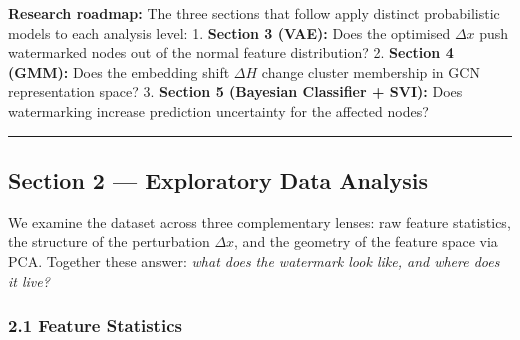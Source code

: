 \documentclass[11pt]{article}
\begin{document}
\textbf{Research roadmap:} The three sections that follow apply distinct
probabilistic models to each analysis level: 1. \textbf{Section 3
(VAE):} Does the optimised \(\Delta x\) push watermarked nodes out of
the normal feature distribution? 2. \textbf{Section 4 (GMM):} Does the
embedding shift \(\Delta H\) change cluster membership in GCN
representation space? 3. \textbf{Section 5 (Bayesian Classifier + SVI):}
Does watermarking increase prediction uncertainty for the affected
nodes?

    \begin{center}\rule{0.5\linewidth}{0.5pt}\end{center}

\subsection{Section 2 --- Exploratory Data
Analysis}\label{section-2-exploratory-data-analysis}

We examine the dataset across three complementary lenses: raw feature
statistics, the structure of the perturbation \(\Delta x\), and the
geometry of the feature space via PCA. Together these answer: \emph{what
does the watermark look like, and where does it live?}

    \subsubsection{2.1 Feature Statistics}\label{feature-statistics}
\end{document}
